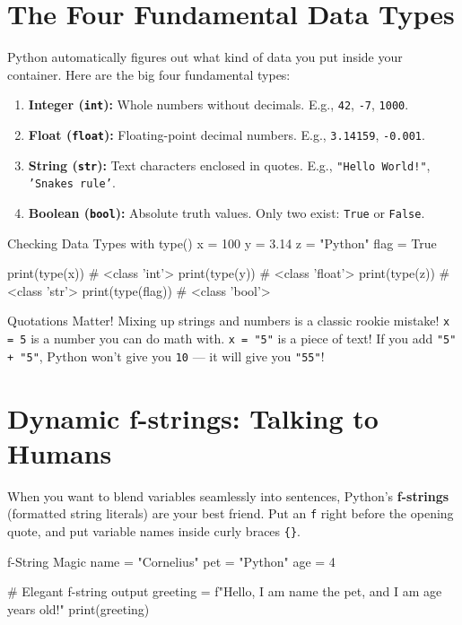 \section{The Four Fundamental Data Types}

Python automatically figures out what kind of data you put inside your container. Here are the big four fundamental types:

\begin{enumerate}
    \item \textbf{Integer (\texttt{int}):} Whole numbers without decimals. E.g., \texttt{42}, \texttt{-7}, \texttt{1000}.
    \item \textbf{Float (\texttt{float}):} Floating-point decimal numbers. E.g., \texttt{3.14159}, \texttt{-0.001}.
    \item \textbf{String (\texttt{str}):} Text characters enclosed in quotes. E.g., \texttt{"Hello World!"}, \texttt{'Snakes rule'}.
    \item \textbf{Boolean (\texttt{bool}):} Absolute truth values. Only two exist: \texttt{True} or \texttt{False}.
\end{enumerate}

\begin{pycode}{Checking Data Types with type()}
x = 100
y = 3.14
z = "Python"
flag = True

print(type(x))     # <class 'int'>
print(type(y))     # <class 'float'>
print(type(z))     # <class 'str'>
print(type(flag))  # <class 'bool'>
\end{pycode}

\begin{viperpitfall}{Quotations Matter!}
Mixing up strings and numbers is a classic rookie mistake!
\texttt{x = 5} is a number you can do math with.
\texttt{x = "5"} is a piece of text! If you add \texttt{"5" + "5"}, Python won't give you \texttt{10} --- it will give you \texttt{"55"}!
\end{viperpitfall}

\section{Dynamic f-strings: Talking to Humans}

When you want to blend variables seamlessly into sentences, Python's \textbf{f-strings} (formatted string literals) are your best friend. Put an \texttt{f} right before the opening quote, and put variable names inside curly braces \texttt{\{\}}.

\begin{pycode}{f-String Magic}
name = "Cornelius"
pet = "Python"
age = 4

# Elegant f-string output
greeting = f"Hello, I am {name} the {pet}, and I am {age} years old!"
print(greeting)
\end{pycode}

